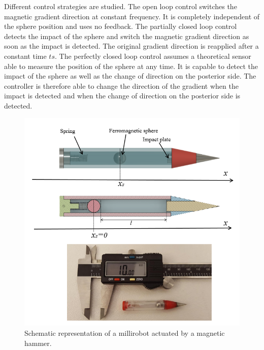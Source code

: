 \documentclass[letterpaper, 10 pt, conference]{ieeeconf}  %
\begin{document}
Different control strategies are studied. The open loop control switches the magnetic gradient direction at constant frequency. It is completely independent of the sphere position and uses no feedback. The partially closed loop control detects the impact of the sphere and switch the magnetic gradient direction as soon as the impact is detected. The original gradient direction is reapplied after a constant time $ts$. The perfectly closed loop control assumes a theoretical sensor able to measure the position of the sphere at any time. It is capable to detect the impact of the sphere as well as the change of direction on the posterior side. The controller is therefore able to change the direction of the gradient when the impact is detected and when the change of direction on the posterior side is detected.\par


\begin{figure}
  \includegraphics[width=\linewidth]{figure1-2.png}
  \caption{Schematic representation of a millirobot actuated by a magnetic hammer.}
  \label{millirobot}
  \vspace{-2em}
\end{figure}
\end{document}
